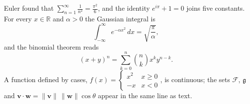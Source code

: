 Euler found that $\sum_{n=1}^\infty \frac{1}{n^2} = \frac{\pi^2}{6}$, and the identity
$e^{i\pi} + 1 = 0$ joins five constants. For every $x \in \mathbb{R}$ and $\alpha > 0$ the
Gaussian integral is
\[ \int_{-\infty}^{\infty} e^{-\alpha x^2}\,dx = \sqrt{\frac{\pi}{\alpha}}, \]
and the binomial theorem reads
\[ (x + y)^n = \sum_{k=0}^{n} \binom{n}{k} x^k y^{n-k}. \]
A function defined by cases, $f(x) = \left\{ \begin{array}{ll} x^2 & x \ge 0 \\ -x & x < 0
\end{array} \right.$, is continuous; the sets $\mathcal{F}$, $\mathfrak{g}$ and
$\mathbf{v} \cdot \mathbf{w} = \lVert \mathbf{v} \rVert \, \lVert \mathbf{w} \rVert \cos\theta$
appear in the same line as text.
